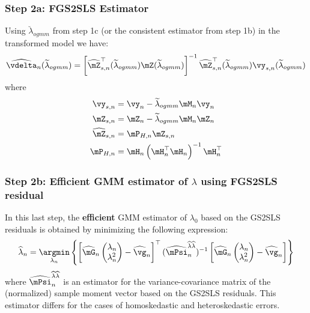 \documentclass[english,12pt]{book}\usepackage[]{graphicx}\usepackage[]{xcolor}
\begin{document}
\subsubsection{Step 2a: FGS2SLS Estimator}

Using $\breve{\lambda}_{ogmm}$ from step 1c (or the consistent estimator from step 1b) in the transformed model we have:
\begin{equation*}
  \widehat{\vdelta}_n(\widetilde{\lambda}_{ogmm}) = \left[\widehat{\mZ}_{s,n}^\top(\widetilde{\lambda}_{ogmm}) \mZ(\widetilde{\lambda}_{ogmm})\right]^{-1}  \widehat{\mZ}_{s, n}^\top(\widetilde{\lambda}_{ogmm}) \vy_{s, n}(\widetilde{\lambda}_{ogmm})
\end{equation*}
%
where
\begin{equation*}
  \begin{aligned}
    \vy_{s, n}           & = \vy_n - \widetilde{\lambda}_{ogmm}\mM_n\vy_n \\
    \mZ_{s, n}           & = \mZ_n - \widetilde{\lambda}_{ogmm}\mM_n\mZ_n \\
    \widehat{\mZ}_{s, n} & = \mP_{H, n}\mZ_{s, n} \\
    \mP_{H, n}           & = \mH_n\left(\mH^\top_n\mH_n\right)^{-1}\mH^\top_n
  \end{aligned}
\end{equation*}


\subsubsection{Step 2b: Efficient GMM estimator of $\lambda$ using FGS2SLS  residual}

In this last step, the \textbf{efficient} GMM estimator of $\lambda_0$ based on the GS2SLS residuals is obtained by minimizing the following expression:
\begin{equation*}
\widehat{\lambda}_n = \underset{\lambda_n}{\argmin}\left\lbrace \left[\widehat{\mG}_n
\begin{pmatrix} \lambda_n \\
                \lambda^2_n
\end{pmatrix}
- \widehat{\vg}_n \right]^\top (\widehat{\mPsi}_n^{\widehat{\lambda}\widehat{\lambda}})^{-1} \left[\widehat{\mG}_n\begin{pmatrix} \lambda_n \\
                \lambda^2_n
\end{pmatrix} - \widehat{\vg}_n \right]\right\rbrace
\end{equation*}
%
where $\widehat{\mPsi}_n^{\widehat{\lambda}\widehat{\lambda}}$ is an estimator for the variance-covariance matrix of the (normalized) sample moment vector based on the GS2SLS residuals. This estimator differs for the cases of homoskedastic and heteroskedastic errors.
\end{document}
